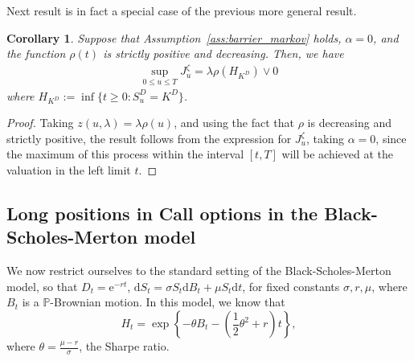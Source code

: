 \documentclass[a4paper]{amsart}
\newtheorem{corollary}[theorem]{Corollary}
\theoremstyle{definition}
\theoremstyle{remark}
\numberwithin{equation}{section}
\renewcommand{\P}{\mathbb{P}}
\newcommand{\di}{\mathrm{d}}
\newcommand{\half}{\dfrac{1}{2}}
\newcommand{\dt}{\mathrm{d}t}
\newcommand{\me}{\mathrm{e}}
\begin{document}
Next result is in fact a special case of the previous more general
result.
\begin{corollary} \label{lem:rho-dec}
  Suppose that Assumption~\ref{ass:barrier_markov} holds, $\alpha = 0$, and the function $\rho(t)$ is strictly positive and decreasing. Then, we have
  \begin{align*}
    \sup_{0 \le u \le T} J_u^\zeta = \lambda \rho(H_{K^D}) \vee 0
  \end{align*}
  where $H_{K^D} := \inf \{ t \ge 0 : S_u^D = K^D\}$.
\end{corollary}
\begin{proof}
 Taking $z(u,\lambda)=\lambda \rho (u)$, and using the fact that $\rho$ is decreasing and strictly positive, the result follows from the expression for $J^\zeta_u$, taking $\alpha=0$, since the maximum of this process within the interval $[t,T]$ will be achieved at the valuation in the  left limit $t$.
\end{proof}

\subsection{Long positions in Call options in the Black-Scholes-Merton model}

We now restrict ourselves to the standard setting of the Black-Scholes-Merton model, so that $D_t = \me^{-rt}$, $\di S_t = \sigma S_t \di B_t + \mu S_t \dt$, for fixed constants $\sigma, r, \mu$, where $B_t$ is a $\P$-Brownian motion. In this model, we know that \[H_t = \exp\left\{-\theta B_t - \left(\half \theta^2 +r\right) t \right\},\] where $\theta = \frac{\mu-r}{\sigma}$, the Sharpe ratio.
\end{document}
